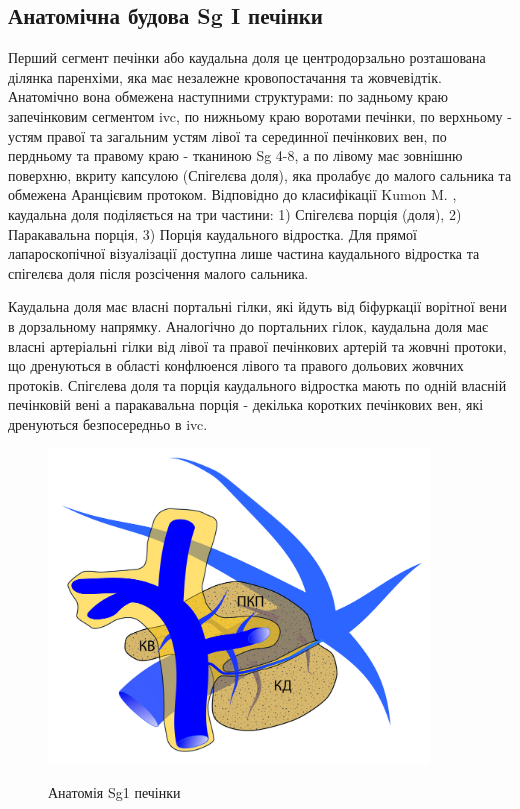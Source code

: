\begin{refsection}
\subsection{Анатомічна будова Sg I печінки}

Перший сегмент печінки або каудальна доля це центродорзально розташована ділянка паренхіми, яка має незалежне кровопостачання та жовчевідтік. Анатомічно вона обмежена наступними структурами: по задньому краю запечінковим сегментом \acrshort{ivc}, по нижньому краю воротами печінки, по верхньому - устям правої та загальним устям лівої та серединної печінкових вен, по пердньому та правому краю - тканиною Sg 4-8, а по лівому має зовнішню поверхню, вкриту капсулою (Спігелєва доля), яка пролабує до малого сальника та обмежена Аранцієвим протоком. Відповідно до класифікації Kumon M. \cite{Kumon2017}, каудальна доля поділяється на три частини: 1) Спігелєва порція (доля),  2) Паракавальна порція, 3) Порція каудального відростка. Для прямої лапароскопічної візуалізації  доступна лише частина каудального відростка та спігелєва доля після розсічення малого сальника.

Каудальна доля має власні портальні гілки, які йдуть від біфуркації ворітної вени в дорзальному напрямку. Аналогічно до портальних гілок, каудальна доля має власні артеріальні гілки від лівої та правої печінкових артерій та жовчні протоки, що дренуються в області конфлюенся лівого та правого дольових жовчних протоків. Спігєлева доля та порція каудального відростка мають по одній власній печінковій вені а паракавальна порція - декілька коротких печінкових вен, які дренуються безпосередньо в \acrshort{ivc}. 

\begin{figure}[h]
\caption{Анатомія Sg1 печінки}
\centering
\includegraphics[width=0.9\textwidth]{Illustrations/Chapter_01/Sg1.jpg}
\label{fig:Sg1}
\end{figure}


\end{refsection}
